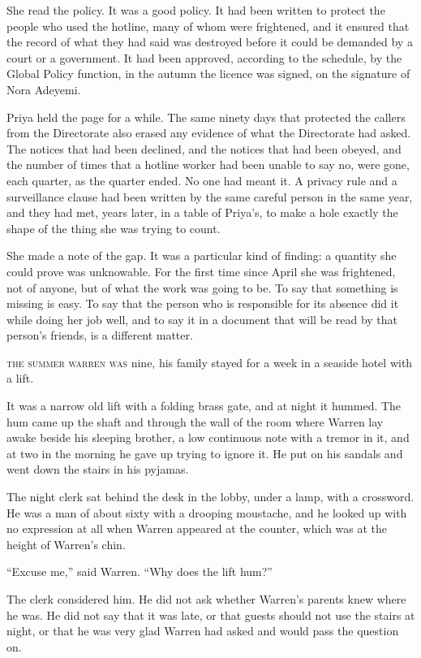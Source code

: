 She read the policy. It was a good policy. It had been written to protect the people who used the hotline, many of whom were frightened, and it ensured that the record of what they had said was destroyed before it could be demanded by a court or a government. It had been approved, according to the schedule, by the Global Policy function, in the autumn the licence was signed, on the signature of Nora Adeyemi.

Priya held the page for a while. The same ninety days that protected the callers from the Directorate also erased any evidence of what the Directorate had asked. The notices that had been declined, and the notices that had been obeyed, and the number of times that a hotline worker had been unable to say no, were gone, each quarter, as the quarter ended. No one had meant it. A privacy rule and a surveillance clause had been written by the same careful person in the same year, and they had met, years later, in a table of Priya's, to make a hole exactly the shape of the thing she was trying to count.

She made a note of the gap. It was a particular kind of finding: a quantity she could prove was unknowable. For the first time since April she was frightened, not of anyone, but of what the work was going to be. To say that something is missing is easy. To say that the person who is responsible for its absence did it while doing her job well, and to say it in a document that will be read by that person's friends, is a different matter.


\textsc{the summer warren was} nine, his family stayed for a week in a seaside hotel with a lift.

It was a narrow old lift with a folding brass gate, and at night it hummed. The hum came up the shaft and through the wall of the room where Warren lay awake beside his sleeping brother, a low continuous note with a tremor in it, and at two in the morning he gave up trying to ignore it. He put on his sandals and went down the stairs in his pyjamas.

The night clerk sat behind the desk in the lobby, under a lamp, with a crossword. He was a man of about sixty with a drooping moustache, and he looked up with no expression at all when Warren appeared at the counter, which was at the height of Warren's chin.

``Excuse me,'' said Warren. ``Why does the lift hum?''

The clerk considered him. He did not ask whether Warren's parents knew where he was. He did not say that it was late, or that guests should not use the stairs at night, or that he was very glad Warren had asked and would pass the question on.


